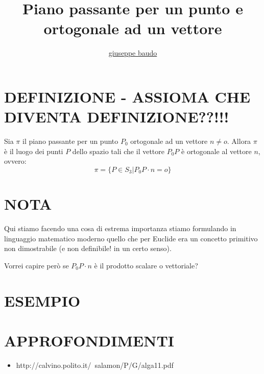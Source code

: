 \documentclass[a4paper,10pt]{article}
\title{Piano passante per un punto e ortogonale ad un vettore}
\author{\href{http://www.baudo.hol.es}{giuseppe baudo}}
\begin{document}
\maketitle

\section{DEFINIZIONE - ASSIOMA CHE DIVENTA DEFINIZIONE??!!!}
Sia $\pi$ il piano passante per un punto $P_0$ ortogonale ad un vettore $n \ne o$. Allora $\pi$ è il luogo
dei punti $P$ dello spazio tali che il vettore $P_0P$ è ortogonale al vettore $n$, ovvero:
\[
 \pi = \{ P \in S_3 | P_0P \cdot n = o  \} 
\]


\section{NOTA}
Qui stiamo facendo una cosa di estrema importanza stiamo formulando in linguaggio matematico moderno quello che per Euclide era un
concetto primitivo non dimostrabile (e non definibile! in un certo senso).

Vorrei capire però se $P_0P \cdot n$ è il prodotto scalare o vettoriale?

\section{ESEMPIO}

\section{APPROFONDIMENTI}
\begin{itemize}
 \item http://calvino.polito.it/~salamon/P/G/alga11.pdf
\end{itemize}
\end{document}
